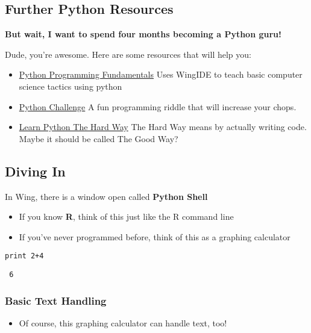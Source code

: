 \documentclass[11pt]{article}
\begin{document}
\subsection{Further Python Resources}
\label{sec-2-2}


   \textbf{But wait, I want to spend four months becoming a Python guru!}

   Dude, you're awesome.  Here are some resources that will help you:

\begin{itemize}
\item \href{http://knuth.luther.edu/~leekent/IntroToComputing/}{Python Programming Fundamentals}
     Uses WingIDE to teach basic computer science tactics using python
\item \href{http://www.pythonchallenge.com/}{Python Challenge}
     A fun programming riddle that will increase your chops.
\item \href{http://learnpythonthehardway.org/}{Learn Python The Hard Way}
     The Hard Way means by actually writing code.  Maybe it should be
     called The Good Way?
\end{itemize}
\subsection{Diving In}
\label{sec-2-3}

   In Wing, there is a window open called \textbf{Python Shell}   
\begin{itemize}
\item If you know \textbf{R}, think of this just like the R command line
\item If you've never programmed before, think of this as a graphing calculator
\end{itemize}

\begin{verbatim}
print 2+4
\end{verbatim}

\begin{verbatim}
 6
\end{verbatim}
\subsubsection{Basic Text Handling}
\label{sec-2-3-1}

\begin{itemize}
\item Of course, this graphing calculator can handle text, too!
\end{itemize}
\end{document}
